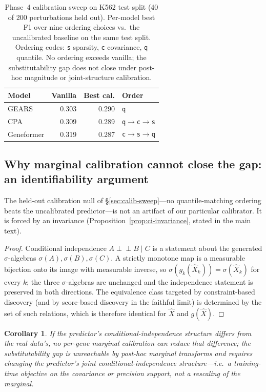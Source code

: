 \documentclass{article}
\theoremstyle{plain}
\newtheorem{corollary}[theorem]{Corollary}
\theoremstyle{definition}
\theoremstyle{remark}
\begin{document}
\begin{table}[h]
\centering
\small
\begin{tabular}{lrrl}
\toprule
\textbf{Model} & \textbf{Vanilla} & \textbf{Best cal.} & \textbf{Order} \\
\midrule
GEARS       & 0.303 & 0.290 & \texttt{q} \\
CPA         & 0.309 & 0.289 & \texttt{q$\to$c$\to$s} \\
Geneformer  & 0.319 & 0.287 & \texttt{c$\to$s$\to$q} \\
\bottomrule
\end{tabular}
\caption{Phase~4 calibration sweep on K562 test split (40 of 200 perturbations held out). Per-model best F1 over nine ordering choices vs.\ the uncalibrated baseline on the same test split. Ordering codes: \texttt{s} sparsity, \texttt{c} covariance, \texttt{q} quantile. No ordering exceeds vanilla; the substitutability gap does not close under post-hoc magnitude or joint-structure calibration.}
\label{tab:calib_sweep}
\end{table}

\subsection{Why marginal calibration cannot close the gap: an identifiability argument}
\label{app:identifiability}
The held-out calibration null of \S\ref{sec:calib-sweep}---no quantile-matching ordering beats the uncalibrated predictor---is not an artifact of our particular calibrator. It is forced by an invariance (Proposition~\ref{prop:ci-invariance}, stated in the main text).

\begin{proof}
Conditional independence $A\perp\!\!\!\perp B\mid C$ is a statement about the generated $\sigma$-algebras $\sigma(A),\sigma(B),\sigma(C)$. A strictly monotone map is a measurable bijection onto its image with measurable inverse, so $\sigma(g_k(\hat X_k))=\sigma(\hat X_k)$ for every $k$; the three $\sigma$-algebras are unchanged and the independence statement is preserved in both directions. The equivalence class targeted by constraint-based discovery (and by score-based discovery in the faithful limit) is determined by the set of such relations, which is therefore identical for $\hat X$ and $g(\hat X)$.
\end{proof}

\begin{corollary}
\label{cor:calib-kernel}
If the predictor's conditional-independence structure differs from the real data's, no per-gene marginal calibration can reduce that difference; the substitutability gap is unreachable by post-hoc marginal transforms and requires changing the predictor's joint conditional-independence structure---i.e.\ a training-time objective on the covariance or precision support, not a rescaling of the marginal.
\end{corollary}
\end{document}
